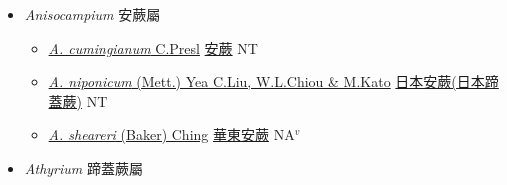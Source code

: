 
  \begin{itemize}
 \item[] \textit{Anisocampium} 安蕨屬
                    
  \begin{itemize}
        \item[] \href{http://www.theplantlist.org/tpl1.1/search?q=Anisocampium+cumingianum}{\textit{A. cumingianum} C.Presl}   \href{\detokenize{http://taibnet.sinica.edu.tw/chi/taibnet_species_list.php?T2=安蕨&T2_new_value=true&fr=y}}{安蕨} NT
        \item[] \href{http://www.theplantlist.org/tpl1.1/search?q=Anisocampium+niponicum}{\textit{A. niponicum} (Mett.) Yea C.Liu, W.L.Chiou \& M.Kato}     \href{\detokenize{http://taibnet.sinica.edu.tw/chi/taibnet_species_list.php?T2=日本安蕨&T2_new_value=true&fr=y}}{日本安蕨(日本蹄蓋蕨)}   NT
        \item[] \href{http://www.theplantlist.org/tpl1.1/search?q=Anisocampium+sheareri}{\textit{A. sheareri} (Baker) Ching}   \href{\detokenize{http://taibnet.sinica.edu.tw/chi/taibnet_species_list.php?T2=華東安蕨&T2_new_value=true&fr=y}}{華東安蕨} NA$^v$
  \end{itemize}
 \item[] \textit{Athyrium} 蹄蓋蕨屬
                    

\end{itemize}

